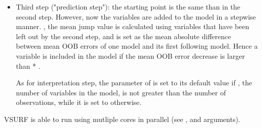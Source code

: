 \documentclass[11pt]{article}
\begin{document}
\begin{Details}
\begin{itemize}
\item Third step ("prediction step"): the starting point is the same than in
the second step. However, now the variables are added to the model in a
stepwise manner. , the mean jump value is calculated using
variables that have been left out by the second step, and is set as the mean
absolute difference between mean OOB errors of one model and its first
following model.  Hence a variable is included in the model if the mean OOB
error decrease is larger than  * .

As for interpretation step,
the  parameter of  is set to its default value
if , the number of variables
in the model, is not greater than the number of observations,
while it is set to  otherwise.
\end{itemize}


VSURF is able to run using mutliple cores in parallel
(see ,  and  arguments).
\end{Details}
%
\end{document}
